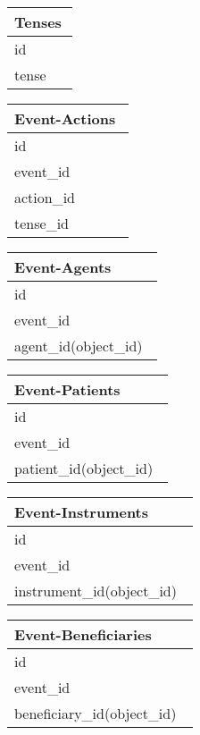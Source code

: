 \documentclass[10pt]{article}
\begin{document}
\begin{multicols}{2}
\begin{tabular}{|p{0.95\linewidth}|} 
\hline                   
\textbf{Tenses}
\\
\hline
id\\
\hline
tense\\
\hline
\end{tabular}



\begin{tabular}{|p{0.95\linewidth}|} 
\hline                   
\textbf{Event-Actions}
\\
\hline
id\\
\hline
event\_id\\
\hline
action\_id\\
\hline
tense\_id\\
\hline
\end{tabular}




\begin{tabular}{|p{0.95\linewidth}|} 
\hline                   
\textbf{Event-Agents}
\\
\hline
id\\
\hline
event\_id\\
\hline
agent\_id(object\_id)\\
\hline
\end{tabular}
\label{table:nonlin}




\begin{tabular}{|p{0.95\linewidth}|} 
\hline                   
\textbf{Event-Patients}
\\
\hline
id\\
\hline
event\_id\\
\hline
patient\_id(object\_id)\\
\hline
\end{tabular}




\begin{tabular}{|p{0.95\linewidth}|} 
\hline                   
\textbf{Event-Instruments}
\\
\hline
id\\
\hline
event\_id\\
\hline
instrument\_id(object\_id)\\
\hline
\end{tabular}



\begin{tabular}{|p{0.95\linewidth}|} 
\hline                   
\textbf{Event-Beneficiaries}
\\
\hline
id\\
\hline
event\_id\\
\hline
beneficiary\_id(object\_id)\\
\hline
\end{tabular}



\end{multicols}
\end{document}
